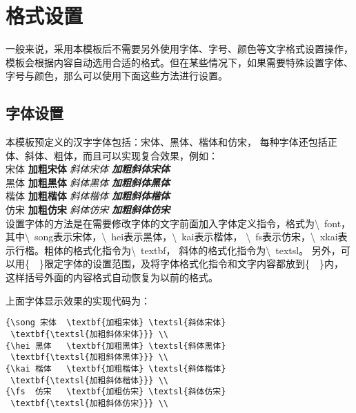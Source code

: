 \section{格式设置}
一般来说，采用本模板后不需要另外使用字体、字号、颜色等文字格式设置操作，
模板会根据内容自动选用合适的格式。但在某些情况下，如果需要特殊设置字体、
字号与颜色，那么可以使用下面这些方法进行设置。

\subsection{字体设置}
本模板预定义的汉字字体包括：{\song 宋体}、{\hei 黑体}、{\kai 楷体}和{\fs 仿宋}，
每种字体还包括正体、斜体、粗体，而且可以实现复合效果，例如：\\
{\song 宋体  \textbf{加粗宋体} \textsl{斜体宋体} \textbf{\textsl{加粗斜体宋体}}} \\
{\hei 黑体   \textbf{加粗黑体} \textsl{斜体黑体} \textbf{\textsl{加粗斜体黑体}}} \\
{\kai 楷体   \textbf{加粗楷体} \textsl{斜体楷体} \textbf{\textsl{加粗斜体楷体}}} \\
{\fs  仿宋   \textbf{加粗仿宋} \textsl{斜体仿宋} \textbf{\textsl{加粗斜体仿宋}}} \\

设置字体的方法是在需要修改字体的文字前面加入字体定义指令，格式为\textbackslash~font，
其中\textbackslash~song表示宋体，\textbackslash~hei表示黑体，\textbackslash~kai表示楷体，
\textbackslash~fs表示仿宋，\textbackslash~xkai表示行楷。粗体的格式化指令为\textbackslash~textbf，
斜体的格式化指令为\textbackslash~textsl。
另外，可以用\{~~\}限定字体的设置范围，及将字体格式化指令和文字内容都放到\{~~\}内，
这样括号外面的内容格式自动恢复为以前的格式。

上面字体显示效果的实现代码为：

\begin{lstlisting}
{\song 宋体  \textbf{加粗宋体} \textsl{斜体宋体}
 \textbf{\textsl{加粗斜体宋体}}} \\
{\hei 黑体   \textbf{加粗黑体} \textsl{斜体黑体}
 \textbf{\textsl{加粗斜体黑体}}} \\
{\kai 楷体   \textbf{加粗楷体} \textsl{斜体楷体}
 \textbf{\textsl{加粗斜体楷体}}} \\
{\fs  仿宋   \textbf{加粗仿宋} \textsl{斜体仿宋}
 \textbf{\textsl{加粗斜体仿宋}}} \\
\end{lstlisting}


